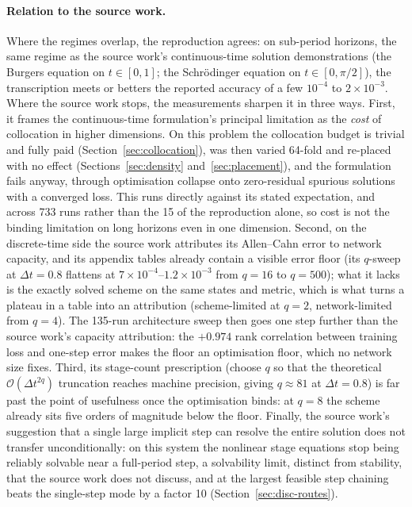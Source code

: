 \documentclass[11pt,a4paper]{article}
\begin{document}
\paragraph{Relation to the source work.}
Where the regimes overlap, the reproduction agrees: on sub-period
horizons, the same regime as the source work's continuous-time solution
demonstrations (the Burgers equation on $t \in [0,1]$; the Schr\"odinger
equation on $t \in [0, \pi/2]$), the
transcription meets or betters the reported accuracy of a few $10^{-4}$ to
$2\times10^{-3}$. Where the source work stops, the measurements sharpen it
in three ways. First, it frames the continuous-time formulation's principal
limitation as the \emph{cost} of collocation in higher dimensions. On this
problem the collocation budget is trivial and fully paid
(Section~\ref{sec:collocation}), was then varied 64-fold and re-placed
with no effect (Sections~\ref{sec:density}
and~\ref{sec:placement}), and the formulation fails anyway, through
optimisation collapse onto zero-residual spurious solutions with a
converged loss. This runs directly against its stated expectation, and
across 733 runs rather than the 15 of the reproduction alone, so cost is
not the binding limitation on long horizons even in one dimension.
Second, on the discrete-time side
the source work attributes its Allen--Cahn error to network capacity, and
its appendix tables already contain a visible error floor (its $q$-sweep
at $\Delta t = 0.8$ flattens at $7\times10^{-4}$--$1.2\times10^{-3}$ from
$q = 16$ to $q = 500$); what it lacks is the exactly solved scheme on the
same states and metric, which is what turns a plateau in a table into an
attribution (scheme-limited at $q = 2$, network-limited from $q = 4$).
The 135-run architecture sweep then goes one step further than the source
work's capacity attribution: the $+0.974$ rank correlation between
training loss and one-step error makes the floor an optimisation floor,
which no network size fixes. Third, its stage-count prescription (choose
$q$ so that the theoretical $\mathcal{O}(\Delta t^{2q})$ truncation
reaches machine precision, giving $q \approx 81$ at $\Delta t = 0.8$) is
far past the point of usefulness once the optimisation binds: at $q = 8$
the scheme already sits five orders of magnitude below the floor.
Finally, the source work's suggestion that a single large implicit step
can resolve the entire solution does not transfer unconditionally: on
this system the nonlinear stage equations stop being reliably solvable
near a full-period step, a solvability limit, distinct from stability,
that the source work does not discuss, and at the largest feasible step
chaining beats the single-step mode by a factor 10
(Section~\ref{sec:disc-routes}).
\end{document}
